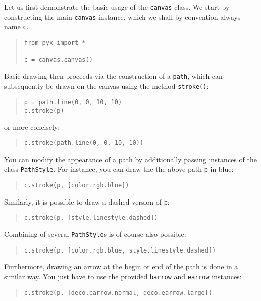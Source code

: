 Let us first demonstrate the basic usage of the \texttt{canvas} class.
We start by constructing the main \verb|canvas| instance, which we
shall by convention always name \verb|c|.
\begin{quote}
\begin{verbatim}
from pyx import *

c = canvas.canvas()
\end{verbatim}
\end{quote}
Basic drawing then proceeds via the construction of a \verb|path|, which 
can subsequently be drawn on the canvas using the method \verb|stroke()|:
\begin{quote}
\begin{verbatim}
p = path.line(0, 0, 10, 10)
c.stroke(p)
\end{verbatim}
\end{quote}
or more concisely:
\begin{quote}
\begin{verbatim}
c.stroke(path.line(0, 0, 10, 10))
\end{verbatim}
\end{quote}
You can modify the appearance of a path by additionally passing 
instances of the class \verb|PathStyle|. For instance, you can draw the 
the above path \verb|p| in blue:
\begin{quote}
\begin{verbatim}
c.stroke(p, [color.rgb.blue])
\end{verbatim}
\end{quote}
Similarly, it is possible to draw a dashed version of \verb|p|:
\begin{quote}
\begin{verbatim}
c.stroke(p, [style.linestyle.dashed])
\end{verbatim}
\end{quote}
Combining of several \verb|PathStyle|s is of course also possible:
\begin{quote}
\begin{verbatim}
c.stroke(p, [color.rgb.blue, style.linestyle.dashed])
\end{verbatim}
\end{quote}
Furthermore, drawing an arrow at the begin or end of the path is done
in a similar way. You just have to use the provided \verb|barrow| and 
\verb|earrow| instances:
\begin{quote}
\begin{verbatim}
c.stroke(p, [deco.barrow.normal, deco.earrow.large])
\end{verbatim}
\end{quote}

